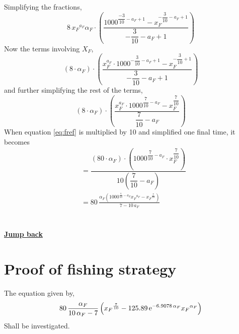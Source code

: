 \documentclass{article}
\numberwithin{equation}{section} %
\begin{document}
Simplifying the fractions,
\begin{equation}
    8\,{x_{F}}^{a_{F}}\alpha_{F}\cdot \left( \dfrac{1000^{\dfrac{-3}{10}-a_{F}+1}-x_{F}^{-\dfrac{3}{10}-a_{F}+1}}{-\dfrac{3}{10}-a_{F}+1} \right)
\end{equation}
Now the terms involving $X_{F}$,
\begin{equation}
    (8\cdot\alpha_{F})\cdot \left( \dfrac{x_{F}^{a_{F}}\cdot1000^{-\dfrac{3}{10}-a_{F}+1}-x_{F}^{-\dfrac{3}{10}+1}}{-\dfrac{3}{10}-a_{F}+1} \right)
\end{equation}
and further simplifying the rest of the terms,
\begin{equation}\label{eq:fref}
    (8\cdot\alpha_{F})\cdot\left( \dfrac{x_{F}^{a_{F}}\cdot1000^{\dfrac{7}{10}-a_{F}}-x_{F}^{\dfrac{7}{10}}}{\dfrac{7}{10}-a_{F}} \right)
\end{equation}
When equation \ref{eq:fref} is multiplied by 10 and simplified one final time, it becomes
\begin{equation}
\begin{aligned}
&=\dfrac{\left(80\cdot\alpha_{F}\right)\cdot\left( 1000^{\dfrac{7}{10}-a_{F}}\cdot x_{F}^{\dfrac{7}{10}}\right)}{10\left(\dfrac{7}{10}-a_{F}\right)}\\
&=80\,{\frac {\alpha_{F} \left( {1000}^{{\frac{7}{10}}-a_{F}}{x_{F}}^{a_{F}}-{x_{F}}
^{{\frac{7}{10}}} \right)
}{7-10\,a_{F}}}
\end{aligned}
\end{equation}\\
\\
\textbf{\hyperref[jmp:a:yieldFunction]{Jump back }}

\newpage
\section{Proof of fishing strategy}\label{a:fishingStrategy}
The equation given by, 
\begin{equation}
    80\,{\frac {\alpha_{F}}{10\,\alpha_{F}-7} \left( {x_{F}}^{{\frac{7}{10
}}}- 125.89\,{{\rm e}^{- 6.9078\,\alpha_{F}}}{x_{F}}^{\alpha_{F}}
 \right) }
\end{equation}
Shall be investigated.
\end{document}
